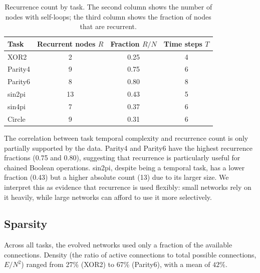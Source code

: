 \begin{table}[h]
  \centering
  \small
  \caption{Recurrence count by task. The second column shows the
    number of nodes with self-loops; the third column shows the
    fraction of nodes that are recurrent.}
  \label{tab:recurrence}
  \begin{tabular}{lccc}
    \toprule
    \textbf{Task} & \textbf{Recurrent nodes $R$} & \textbf{Fraction $R/N$}
      & \textbf{Time steps $T$} \\
    \midrule
    XOR2      &  2 & 0.25 & 4 \\
    Parity4   &  9 & 0.75 & 6 \\
    Parity6   &  8 & 0.80 & 8 \\
    sin2pi    & 13 & 0.43 & 5 \\
    sin4pi    &  7 & 0.37 & 6 \\
    Circle    &  9 & 0.31 & 6 \\
    \bottomrule
  \end{tabular}
\end{table}

The correlation between task temporal complexity and recurrence count
is only partially supported by the data. Parity4 and Parity6 have the
highest recurrence fractions (0.75 and 0.80), suggesting that
recurrence is particularly useful for chained Boolean operations.
sin2pi, despite being a temporal task, has a lower fraction (0.43)
but a higher absolute count (13) due to its larger size. We interpret
this as evidence that recurrence is used flexibly: small networks
rely on it heavily, while large networks can afford to use it more
selectively.

\subsection{Sparsity}
\label{sec:results-sparsity}

Across all tasks, the evolved networks used only a fraction of the
available connections. Density (the ratio of active connections to
total possible connections, $E / N^2$) ranged from 27\% (XOR2) to
67\% (Parity6), with a mean of $42\%$.

